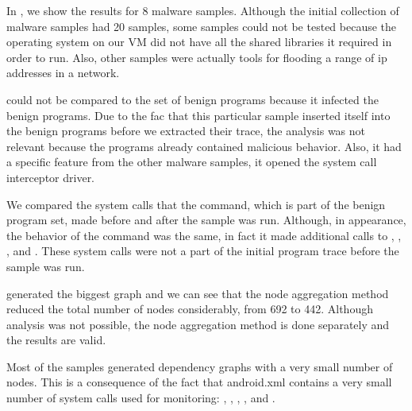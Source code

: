 In , we show the results for 8 malware samples. Although the initial collection of malware samples had 20 samples, some samples could not be tested because the operating system on our VM did not have all the shared libraries it required in order to run. Also, other samples were actually tools for flooding a range of ip addresses in a network.

 could not be compared to the set of benign programs because it infected the benign programs. Due to the fac that this particular sample inserted itself into the benign programs before we extracted their trace, the analysis was not relevant because the programs already contained malicious behavior. Also, it had a specific feature from the other malware samples, it opened the system call interceptor driver.

We compared the system calls that the  command, which is part of the benign program set, made before and after the  sample was run. Although, in appearance, the behavior of the command was the same, in fact it made additional calls to , , ,  and . These system calls were not a part of the initial program trace before the sample was run.

 generated the biggest graph and we can see that the node aggregation method reduced the total number of nodes considerably, from 692 to 442. Although analysis was not possible, the node aggregation method is done separately and the results are valid.

Most of the samples generated dependency graphs with a very small number of nodes. This is a consequence of the fact that android.xml contains a very small number of system calls used for monitoring: , , , ,  and .

